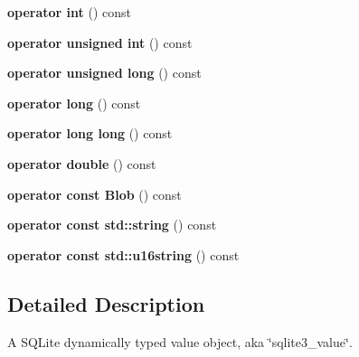 \begin{DoxyCompactItemize}
\item 
\hypertarget{class_s_q_lite_1_1_value_adbb8614964a6724dd5ec65dcdb0d4ab1}{{\bfseries operator int} () const }\label{class_s_q_lite_1_1_value_adbb8614964a6724dd5ec65dcdb0d4ab1}

\item 
\hypertarget{class_s_q_lite_1_1_value_a9a10fa6ba990f034a511764fc7e3b7f9}{{\bfseries operator unsigned int} () const }\label{class_s_q_lite_1_1_value_a9a10fa6ba990f034a511764fc7e3b7f9}

\item 
\hypertarget{class_s_q_lite_1_1_value_a0aa282facbe60435956643ad4f01e413}{{\bfseries operator unsigned long} () const }\label{class_s_q_lite_1_1_value_a0aa282facbe60435956643ad4f01e413}

\item 
\hypertarget{class_s_q_lite_1_1_value_a1f36acd2099170093c5285b04524ca76}{{\bfseries operator long} () const }\label{class_s_q_lite_1_1_value_a1f36acd2099170093c5285b04524ca76}

\item 
\hypertarget{class_s_q_lite_1_1_value_ab5ecb2b66ce289a0023961e6c2959926}{{\bfseries operator long long} () const }\label{class_s_q_lite_1_1_value_ab5ecb2b66ce289a0023961e6c2959926}

\item 
\hypertarget{class_s_q_lite_1_1_value_a44e0812e9ede7042f1d3497fbafd4b15}{{\bfseries operator double} () const }\label{class_s_q_lite_1_1_value_a44e0812e9ede7042f1d3497fbafd4b15}

\item 
\hypertarget{class_s_q_lite_1_1_value_a3481e1de221db430e8efe10d572ff3ba}{{\bfseries operator const Blob} () const }\label{class_s_q_lite_1_1_value_a3481e1de221db430e8efe10d572ff3ba}

\item 
\hypertarget{class_s_q_lite_1_1_value_a39582758e6f28c6bc626e3e5e4cc90e1}{{\bfseries operator const std\-::string} () const }\label{class_s_q_lite_1_1_value_a39582758e6f28c6bc626e3e5e4cc90e1}

\item 
\hypertarget{class_s_q_lite_1_1_value_a7313e05100aa0982b81dcc006dc8b5d5}{{\bfseries operator const std\-::u16string} () const }\label{class_s_q_lite_1_1_value_a7313e05100aa0982b81dcc006dc8b5d5}

\end{DoxyCompactItemize}


\subsection{Detailed Description}
A S\-Q\-Lite dynamically typed value object, aka \char`\"{}sqlite3\-\_\-value\char`\"{}. 


